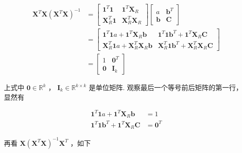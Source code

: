 \documentclass[UTF8]{ctexart}
\begin{document}
    \begin{equation}
    	\begin{aligned}
    		\boldsymbol{X}^T \boldsymbol{X} (\boldsymbol{X}^T \boldsymbol{X})^{-1} & = \begin{bmatrix}
    			\boldsymbol{1}^T \boldsymbol{1} & \boldsymbol{1}^T \boldsymbol{X}_R \\
    			\boldsymbol{X}_R^T \boldsymbol{1} & \boldsymbol{X}_R^T \boldsymbol{X}_R
    		\end{bmatrix} \begin{bmatrix}
    		    a & \boldsymbol{b}^T \\
    		    \boldsymbol{b} & \boldsymbol{C}
    		\end{bmatrix} \\
    	    & = \begin{bmatrix}
    	    	\boldsymbol{1}^T \boldsymbol{1} a + \boldsymbol{1}^T \boldsymbol{X}_R \boldsymbol{b} & \boldsymbol{1}^T \boldsymbol{1} \boldsymbol{b}^T + \boldsymbol{1}^T \boldsymbol{X}_R \boldsymbol{C} \\
    	    	\boldsymbol{X}_R^T \boldsymbol{1} a + \boldsymbol{X}_R^T \boldsymbol{X}_R \boldsymbol{b} & \boldsymbol{X}_R^T \boldsymbol{1} \boldsymbol{b}^T + \boldsymbol{X}_R^T \boldsymbol{X}_R \boldsymbol{C}
    	    \end{bmatrix} \\
            & = \begin{bmatrix}
            	1 & \boldsymbol{0}^T \\
            	\boldsymbol{0} & \boldsymbol{I}_k
            \end{bmatrix}
    	\end{aligned}
    \end{equation}

    上式中 $ \boldsymbol{0} \in \mathbb{R}^k $ ， $ \boldsymbol{I}_k \in \mathbb{R}^{k \times k} $ 是单位矩阵. 观察最后一个等号前后矩阵的第一行，显然有
    
    \begin{equation}
    	\begin{aligned}
    		\boldsymbol{1}^T \boldsymbol{1} a + \boldsymbol{1}^T \boldsymbol{X}_R \boldsymbol{b} & = 1 \\
    		\boldsymbol{1}^T \boldsymbol{1} \boldsymbol{b}^T + \boldsymbol{1}^T \boldsymbol{X}_R \boldsymbol{C} & = \boldsymbol{0}^T
    	\end{aligned}
    \end{equation}

    再看 $ \boldsymbol{X} (\boldsymbol{X}^T \boldsymbol{X})^{-1} \boldsymbol{X}^T $ ，如下
    
\end{document}
